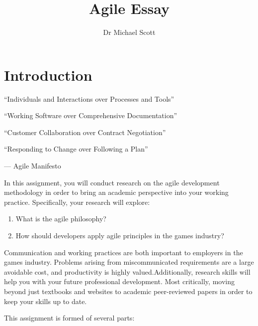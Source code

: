 \documentclass{../fal_assignment}
\title{Agile Essay}
\author{Dr Michael Scott}
\begin{document}
\maketitle

\section*{Introduction}

\begin{marginquote}
  ``Individuals and Interactions over Processes and Tools''
  
  ``Working Software over Comprehensive Documentation''
  
  ``Customer Collaboration over Contract Negotiation''
  
  ``Responding to Change over Following a Plan''
    
    --- Agile Manifesto
\end{marginquote}

In this assignment, you will conduct research on the agile development methodology in order to bring an academic perspective into your working practice. Specifically, your research will explore: 

\begin{enumerate}[label=(\roman*)]
    \item What is the agile philosophy?
    \item How should developers apply agile principles in the games industry?
\end{enumerate}

Communication and working practices are both important to employers in the games industry. Problems arising from miscommunicated requirements are a large avoidable cost, and  productivity is highly valued.Additionally, research skills will help you with your future professional development. Most critically, moving beyond just textbooks and websites to academic peer-reviewed papers in order to keep your skills up to date.

This assignment is formed of several parts:
\end{document}
